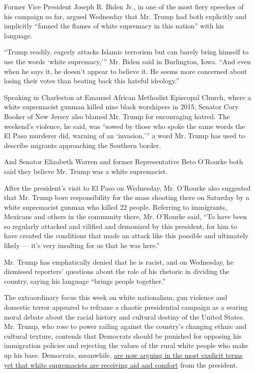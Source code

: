 Former Vice President Joseph R. Biden Jr., in one of the most fiery
speeches of his campaign so far, argued Wednesday that Mr. Trump had
both explicitly and implicitly ``fanned the flames of white supremacy in
this nation'' with his language.

``Trump readily, eagerly attacks Islamic terrorism but can barely bring
himself to use the words `white supremacy,''' Mr. Biden said in
Burlington, Iowa. ``And even when he says it, he doesn't appear to
believe it. He seems more concerned about losing their votes than
beating back this hateful ideology.''

Speaking in Charleston at Emanuel African Methodist Episcopal Church,
where a white supremacist gunman killed nine black worshipers in 2015,
Senator Cory Booker of New Jersey also blamed Mr. Trump for encouraging
hatred. The weekend's violence, he said, was ``sowed by those who spoke
the same words the El Paso murderer did, warning of an `invasion,''' a
word Mr. Trump has used to describe migrants approaching the Southern
border.

And Senator Elizabeth Warren and former Representative Beto O'Rourke
both said they believe Mr. Trump was a white supremacist.

After the president's visit to El Paso on Wednesday, Mr. O'Rourke also
suggested that Mr. Trump bore responsibility for the mass shooting there
on Saturday by a white supremacist gunman who killed 22 people.
Referring to immigrants, Mexicans and others in the community there, Mr.
O'Rourke said, ``To have been so regularly attacked and vilified and
demonized by this president, for him to have created the conditions that
made an attack like this possible and ultimately likely --- it's very
insulting for us that he was here.''

Mr. Trump has emphatically denied that he is racist, and on Wednesday,
he dismissed reporters' questions about the role of his rhetoric in
dividing the country, saying his language ``brings people together.''

The extraordinary focus this week on white nationalism, gun violence and
domestic terror appeared to reframe a chaotic presidential campaign as a
searing moral debate about the racial history and cultural destiny of
the United States. Mr. Trump, who rose to power railing against the
country's changing ethnic and cultural texture, contends that Democrats
should be punished for opposing his immigration policies and rejecting
the values of the rural white people who make up his base. Democrats,
meanwhile,
\href{https://www.nytimes.com/2019/08/05/us/politics/beto-trump.html}{are
now arguing in the most explicit terms yet that white supremacists are
receiving aid and comfort} from the president.

